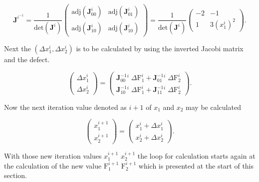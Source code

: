 \documentclass[a4paper, twoside, 11pt]{article}
\begin{document}
    \begin{equation}
        \textbf{J}^i^{-1} =
        \frac{1}{\text{det}(\textbf{J}^i)}
        \begin{pmatrix}
            \text{adj}(\textbf{J}^i_{00}) & \text{adj}(\textbf{J}^i_{01})\\
            \text{adj}(\textbf{J}^i_{10}) & \text{adj}(\textbf{J}^i_{10})
        \end{pmatrix}
        =
        \frac{1}{\text{det}(\textbf{J}^i)}
        \begin{pmatrix}
            -2 & -1\\
            1 & 3 (x_1^i)^2
        \end{pmatrix}.
    \end{equation}
\par
    Next the $(\Delta x_1^i, \Delta x_2^i)$ is to be calculated by using the inverted Jacobi matrix and the defect.

    \begin{equation}
        \begin{pmatrix}
            \Delta x_1^i \\
            \Delta x_2^i
        \end{pmatrix}
        =
        \begin{pmatrix}
            \textbf{J}_{00}^{-1}^i \;\Delta \text{F}_1^i + \textbf{J}_{01}^{-1}^i \;\Delta \text{F}_2^i\\ 
            \textbf{J}_{10}^{-1}^i \;\Delta \text{F}_1^i + \textbf{J}_{11}^{-1}^i \;\Delta \text{F}_2^i
        \end{pmatrix}.
    \end{equation}

    \par
    Now the next iteration value denoted as $i+1$ of $x_1$ and $x_2$ may be calculated

    \begin{equation}
        \begin{pmatrix}
            x_1^{i+1}\\
            x_2^{i+1}
        \end{pmatrix}
        =
        \begin{pmatrix}
            x_1^i + \Delta x_1^i\\
            x_2^i + \Delta x_2^i
        \end{pmatrix}.
    \end{equation}
\par
    With those new iteration values $x_1^{i+1}$ $x_2^{i+1}$ the loop for calculation starts again at the calculation of the new value $\text{F}_1^{i+1}$ $\text{F}_2^{i+1}$ which is presented at the start of this section.
\end{document}
